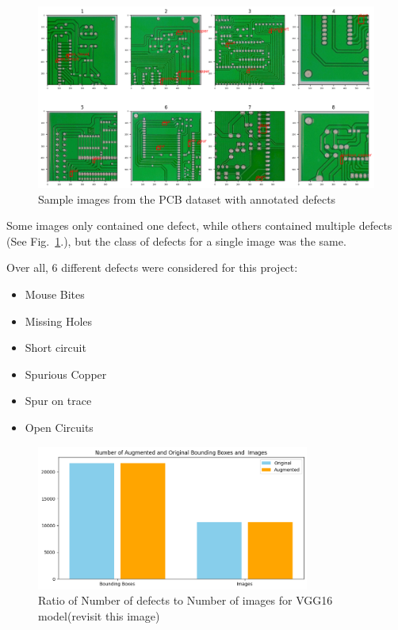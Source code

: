 \documentclass[12pt]{article}
\begin{document}
\begin{figure}[h]
    \centering
    \includegraphics[width=1\textwidth]{./graphics/4.png}
    \caption{Sample images from the PCB dataset with annotated defects}
    \label{fig:sample_pcb_dataset}
\end{figure}

Some images only contained one defect, while others contained multiple defects (See Fig.~\ref{fig:sample_pcb_dataset}.), but the class of defects for a single image was the same.

Over all, 6 different defects were considered for this project:
\begin{itemize}
    \item Mouse Bites
    \item Missing Holes
    \item Short circuit
    \item Spurious Copper
    \item Spur on trace
    \item Open Circuits
\end{itemize}
\begin{figure}[h]
    \centering
    \includegraphics[width=0.8\textwidth]{./graphics/2.png}
    \caption{Ratio of Number of defects to Number of images for VGG16 model(revisit this image)}
    \label{fig:ratio_dataset_vgg16}
\end{figure}
\end{document}
